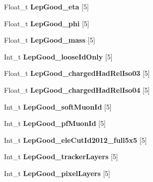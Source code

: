 \begin{DoxyCompactItemize}
\item 
\hypertarget{classMiniTree_ab5211ab9612c5939edfbb8bea7e2f59e}{}\label{classMiniTree_ab5211ab9612c5939edfbb8bea7e2f59e} 
Float\+\_\+t {\bfseries Lep\+Good\+\_\+eta} \mbox{[}5\mbox{]}
\item 
\hypertarget{classMiniTree_a5a01d13be5392d05019d7efd7687d539}{}\label{classMiniTree_a5a01d13be5392d05019d7efd7687d539} 
Float\+\_\+t {\bfseries Lep\+Good\+\_\+phi} \mbox{[}5\mbox{]}
\item 
\hypertarget{classMiniTree_ab0e6f377f12519b3fbd0ca35a3a52e83}{}\label{classMiniTree_ab0e6f377f12519b3fbd0ca35a3a52e83} 
Float\+\_\+t {\bfseries Lep\+Good\+\_\+mass} \mbox{[}5\mbox{]}
\item 
\hypertarget{classMiniTree_a3ab838c3633088245f2f457d48cad817}{}\label{classMiniTree_a3ab838c3633088245f2f457d48cad817} 
Int\+\_\+t {\bfseries Lep\+Good\+\_\+loose\+Id\+Only} \mbox{[}5\mbox{]}
\item 
\hypertarget{classMiniTree_af2e7192bc28db16191f501cdaba9997d}{}\label{classMiniTree_af2e7192bc28db16191f501cdaba9997d} 
Float\+\_\+t {\bfseries Lep\+Good\+\_\+charged\+Had\+Rel\+Iso03} \mbox{[}5\mbox{]}
\item 
\hypertarget{classMiniTree_ae70133724501dcd7951c9e3b199c39b1}{}\label{classMiniTree_ae70133724501dcd7951c9e3b199c39b1} 
Float\+\_\+t {\bfseries Lep\+Good\+\_\+charged\+Had\+Rel\+Iso04} \mbox{[}5\mbox{]}
\item 
\hypertarget{classMiniTree_a4effb593b0ccaa9d0301a0dab4e61d7a}{}\label{classMiniTree_a4effb593b0ccaa9d0301a0dab4e61d7a} 
Int\+\_\+t {\bfseries Lep\+Good\+\_\+soft\+Muon\+Id} \mbox{[}5\mbox{]}
\item 
\hypertarget{classMiniTree_a67effaa15afa6169d6fcc8d89070e129}{}\label{classMiniTree_a67effaa15afa6169d6fcc8d89070e129} 
Int\+\_\+t {\bfseries Lep\+Good\+\_\+pf\+Muon\+Id} \mbox{[}5\mbox{]}
\item 
\hypertarget{classMiniTree_a3b5267257e8a7c2248861d12c2635e1e}{}\label{classMiniTree_a3b5267257e8a7c2248861d12c2635e1e} 
Int\+\_\+t {\bfseries Lep\+Good\+\_\+ele\+Cut\+Id2012\+\_\+full5x5} \mbox{[}5\mbox{]}
\item 
\hypertarget{classMiniTree_a8ff5e6d660c292f8fede958f3427fc09}{}\label{classMiniTree_a8ff5e6d660c292f8fede958f3427fc09} 
Int\+\_\+t {\bfseries Lep\+Good\+\_\+tracker\+Layers} \mbox{[}5\mbox{]}
\item 
\hypertarget{classMiniTree_aeee91755ec037a1cb922148137f565e6}{}\label{classMiniTree_aeee91755ec037a1cb922148137f565e6} 
Int\+\_\+t {\bfseries Lep\+Good\+\_\+pixel\+Layers} \mbox{[}5\mbox{]}

\end{DoxyCompactItemize}
